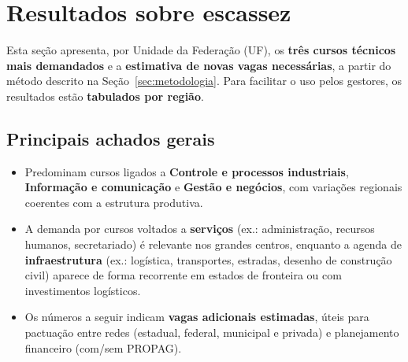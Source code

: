 \section{Resultados sobre escassez}

Esta seção apresenta, por Unidade da Federação (UF), os \textbf{três cursos técnicos mais demandados} e a \textbf{estimativa de novas vagas necessárias}, a partir do método descrito na Seção~\ref{sec:metodologia}. Para facilitar o uso pelos gestores, os resultados estão \textbf{tabulados por região}.

\subsection*{Principais achados gerais}
\begin{itemize}
	\item Predominam cursos ligados a \textbf{Controle e processos industriais}, \textbf{Informação e comunicação} e \textbf{Gestão e negócios}, com variações regionais coerentes com a estrutura produtiva.
	\item A demanda por cursos voltados a \textbf{serviços} (ex.: administração, recursos humanos, secretariado) é relevante nos grandes centros, enquanto a agenda de \textbf{infraestrutura} (ex.: logística, transportes, estradas, desenho de construção civil) aparece de forma recorrente em estados de fronteira ou com investimentos logísticos.
	\item Os números a seguir indicam \textbf{vagas adicionais estimadas}, úteis para pactuação entre redes (estadual, federal, municipal e privada) e planejamento financeiro (com/sem PROPAG).
\end{itemize}

